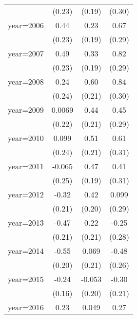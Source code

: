\begin{sidewaystable}[htbp]
\begin{tabular}{l*{3}{c}}
                &   (0.23)         &   (0.19)         &   (0.30)         \\
\addlinespace
year=2006       &     0.44\sym{*}  &     0.23         &     0.67\sym{**} \\
                &   (0.23)         &   (0.19)         &   (0.29)         \\
\addlinespace
year=2007       &     0.49\sym{**} &     0.33\sym{*}  &     0.82\sym{***}\\
                &   (0.23)         &   (0.19)         &   (0.29)         \\
\addlinespace
year=2008       &     0.24         &     0.60\sym{***}&     0.84\sym{***}\\
                &   (0.24)         &   (0.21)         &   (0.30)         \\
\addlinespace
year=2009       &   0.0069         &     0.44\sym{**} &     0.45         \\
                &   (0.22)         &   (0.21)         &   (0.29)         \\
\addlinespace
year=2010       &    0.099         &     0.51\sym{**} &     0.61\sym{**} \\
                &   (0.24)         &   (0.21)         &   (0.31)         \\
\addlinespace
year=2011       &   -0.065         &     0.47\sym{**} &     0.41         \\
                &   (0.25)         &   (0.19)         &   (0.31)         \\
\addlinespace
year=2012       &    -0.32         &     0.42\sym{**} &    0.099         \\
                &   (0.21)         &   (0.20)         &   (0.29)         \\
\addlinespace
year=2013       &    -0.47\sym{**} &     0.22         &    -0.25         \\
                &   (0.21)         &   (0.21)         &   (0.28)         \\
\addlinespace
year=2014       &    -0.55\sym{***}&    0.069         &    -0.48\sym{*}  \\
                &   (0.20)         &   (0.21)         &   (0.26)         \\
\addlinespace
year=2015       &    -0.24         &   -0.053         &    -0.30         \\
                &   (0.16)         &   (0.20)         &   (0.21)         \\
\addlinespace
year=2016       &     0.23\sym{***}&    0.049         &     0.27\sym{*}  \\

\end{tabular}
\end{sidewaystable}
